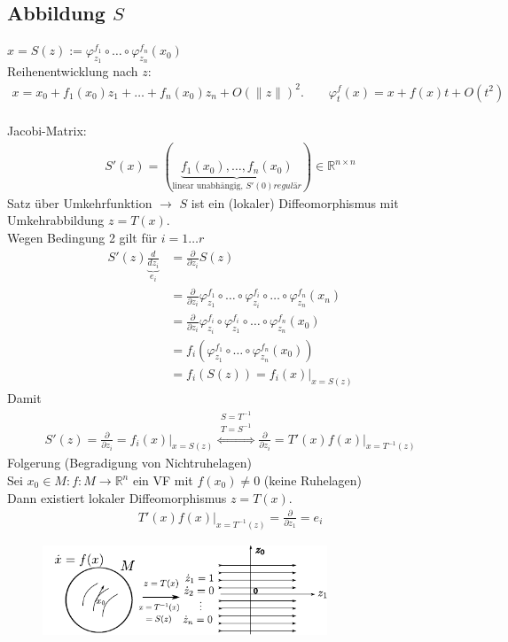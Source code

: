 \documentclass[ngerman]{tudscrreprt}
\begin{document}
\subsection*{Abbildung $S$} $x = S(z):=\varphi_{z_1}^{f_1} \circ \dots \circ \varphi_{z_n}^{f_n}(x_0)$ \\ 
Reihenentwicklung nach $z$: \begin{align*} x = x_0 + f_1(x_0) z_1 + \dots + f_n(x_0)z_n + O(\|z\|)^2. \qquad \varphi_t^f(x) = x+ f(x)t + O(t^2)\end{align*}
\\Jacobi-Matrix: \begin{align*} S'(x) = \left( \underbrace{f_1(x_0),\dots, f_n(x_0)}_{\text{linear unabhängig, }S'(0) regulär} \right)\in \mathbb{R}^{n\times n} \end{align*}
Satz über Umkehrfunktion $\to$ $S$ ist ein (lokaler) Diffeomorphismus mit Umkehrabbildung $z = T(x).$\\ 
Wegen Bedingung 2 gilt für $i = 1 \dots r$ \begin{align*} S'(z)\underbrace{\frac{d}{dz_i}}_{e_i} &= \frac{\partial}{\partial z_i}S(z)\\ &=\frac{\partial}{\partial z_i} \varphi_{z_1}^{f_1} \circ \dots \circ \varphi_{z_i}^{f_i} \circ \dots \circ \varphi_{z_n}^{f_n}(x_n)\\ &=\frac{\partial}{\partial z_i}\varphi_{z_i}^{f_i} \circ \varphi_{z_1}^{f_i} \circ \dots \circ \varphi_{z_n}^{f_n}(x_0) \\ &=f_i \left( \varphi_{z_1}^{f_1}\circ \dots \circ \varphi_{z_n}^{f_n}(x_0) \right)\\ &=f_i\left.\left( S(z) \right) = f_i(x)\right|_{x= S(z)}  \end{align*}
Damit 
\begin{align*} S'(z) = \frac{\partial}{\partial z_i} =\left. f_i(x)\right|_{x= S(z)} \overset{\substack{S = T^{-1}\\ T = S^{-1}}}{\iff} \frac{\partial}{\partial z_i} = \left.T'(x)f(x)\right|_{x = T^{-1}(z)} \end{align*}
Folgerung (Begradigung von Nichtruhelagen)\\ 
Sei $x_0\in M: f: M\to \mathbb{R}^n$ ein VF mit $f(x_0)\ne 0$ (keine Ruhelagen)\\ 
Dann existiert lokaler Diffeomorphismus $z = T(x)$. \begin{align*} T'(x) f(x)|_{x = T^{-1}(z)} = \frac{\partial}{\partial z_1} = e_i \end{align*}
\begin{figure}[H]
\centering
\def\svgwidth{200pt} 
  \includegraphics[width=8.5cm]{Zeichnung1.pdf}
\end{figure}
\end{document}
